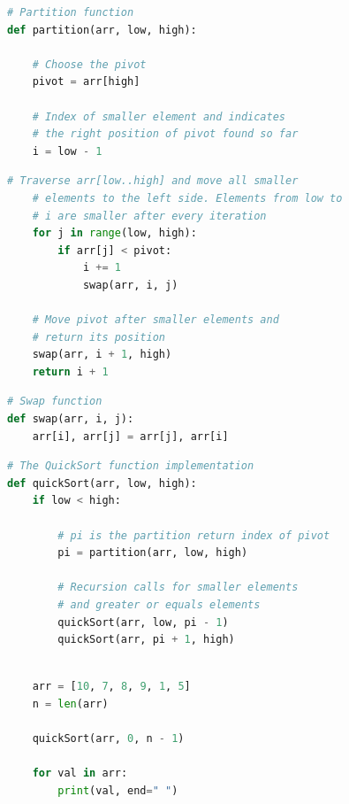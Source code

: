 \documentclass[aspectratio=1610]{beamer}
\begin{document}
\begin{frame}[fragile]
\begin{lstlisting}[language=Python]
# Partition function
def partition(arr, low, high):
    
    # Choose the pivot
    pivot = arr[high]
    
    # Index of smaller element and indicates 
    # the right position of pivot found so far
    i = low - 1
\end{lstlisting}
\end{frame}
    
    
\begin{frame}[fragile]
\begin{lstlisting}[language=Python]    
    # Traverse arr[low..high] and move all smaller
    # elements to the left side. Elements from low to 
    # i are smaller after every iteration
    for j in range(low, high):
        if arr[j] < pivot:
            i += 1
            swap(arr, i, j)
    
    # Move pivot after smaller elements and
    # return its position
    swap(arr, i + 1, high)
    return i + 1
\end{lstlisting}
\end{frame}




\begin{frame}[fragile]
\begin{lstlisting}[language=Python]
# Swap function
def swap(arr, i, j):
    arr[i], arr[j] = arr[j], arr[i]
\end{lstlisting}
\end{frame}


\begin{frame}[fragile]
\begin{lstlisting}[language=Python]
# The QuickSort function implementation
def quickSort(arr, low, high):
    if low < high:
        
        # pi is the partition return index of pivot
        pi = partition(arr, low, high)
        
        # Recursion calls for smaller elements
        # and greater or equals elements
        quickSort(arr, low, pi - 1)
        quickSort(arr, pi + 1, high)
\end{lstlisting}
\end{frame}
        
        
\begin{frame}[fragile]
\begin{lstlisting}[language=Python]
	
    arr = [10, 7, 8, 9, 1, 5]
    n = len(arr)

    quickSort(arr, 0, n - 1)
    
    for val in arr:
        print(val, end=" ") 

\end{lstlisting}
\end{frame}
\end{document}
